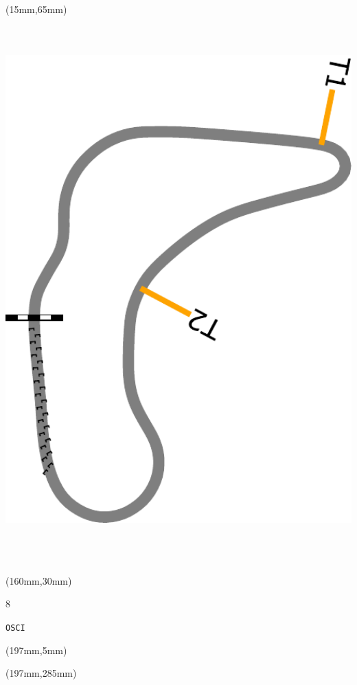 \begin{textblock*}{185mm}(15mm,65mm)%
\centering
\mbox{\includegraphics[width=185mm,height=210mm,keepaspectratio]{PT/OSCI.pdf}}
\end{textblock*}
\begin{textblock*}{40mm}(160mm,30mm)%
\Large
\par{} 
\par8 
\par\hfill\tiny\tt OSCI\\
\end{textblock*}
\begin{textblock*}{20mm}(197mm,5mm)%
\fbox{\thepage}
\label{OSCI}
\end{textblock*}
\begin{textblock*}{20mm}(197mm,285mm)%
\fbox{\thepage}
\end{textblock*}

